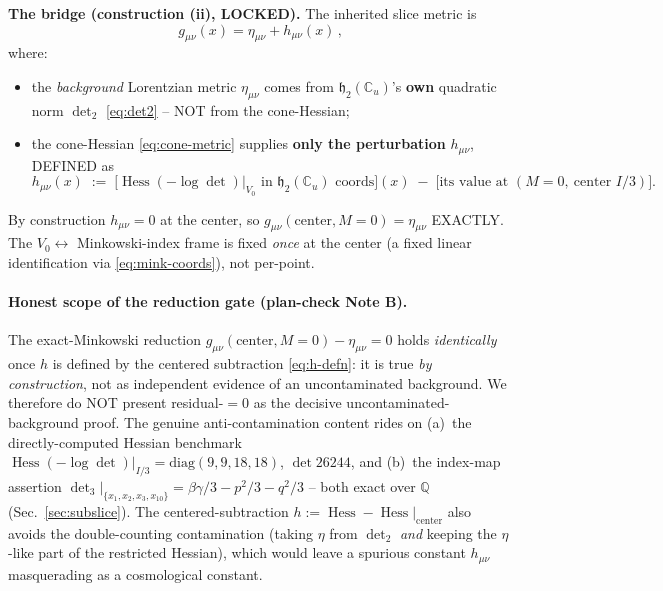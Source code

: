 \medskip
\noindent\textbf{The bridge (construction (ii), LOCKED).} The inherited slice
metric is
\begin{equation}
  \boxed{\,g_{\mu\nu}(x) = \eta_{\mu\nu} + h_{\mu\nu}(x)\,},
  \label{eq:bridge}
\end{equation}
where:
\begin{itemize}
  \item the \emph{background} Lorentzian metric $\eta_{\mu\nu}$ comes from
    $\mathfrak{h}_2(\mathbb{C}_u)$'s \textbf{own} quadratic norm $\det_2$
    \eqref{eq:det2} -- NOT from the cone-Hessian;
  \item the cone-Hessian \eqref{eq:cone-metric} supplies \textbf{only the
    perturbation} $h_{\mu\nu}$, DEFINED as
    \begin{equation}
      h_{\mu\nu}(x) \;:=\;
        \big[\operatorname{Hess}(-\log\det)\big|_{V_0}\text{ in }
          \mathfrak{h}_2(\mathbb{C}_u)\text{ coords}\big](x)
        \;-\;
        \big[\text{its value at } (M=0,\ \text{center } I/3)\big].
      \label{eq:h-defn}
    \end{equation}
\end{itemize}
By construction $h_{\mu\nu} = 0$ at the center, so $g_{\mu\nu}(\text{center},
M{=}0) = \eta_{\mu\nu}$ EXACTLY. The $V_0 \leftrightarrow$ Minkowski-index frame
is fixed \emph{once} at the center (a fixed linear identification via
\eqref{eq:mink-coords}), not per-point.

\paragraph{Honest scope of the reduction gate (plan-check Note B).}
The exact-Minkowski reduction $g_{\mu\nu}(\text{center}, M{=}0) - \eta_{\mu\nu} = 0$
holds \emph{identically} once $h$ is defined by the centered subtraction
\eqref{eq:h-defn}: it is true \emph{by construction}, not as independent evidence
of an uncontaminated background. We therefore do NOT present residual-$=0$ as the
decisive uncontaminated-background proof. The genuine anti-contamination content
rides on (a)~the directly-computed Hessian benchmark
$\operatorname{Hess}(-\log\det)|_{I/3} = \mathrm{diag}(9,9,18,18)$, $\det 26244$,
and (b)~the index-map assertion $\det_3|_{\{x_1,x_2,x_3,x_{10}\}} =
\beta\gamma/3 - p^2/3 - q^2/3$ -- both exact over $\mathbb{Q}$
(Sec.~\ref{sec:subslice}). The centered-subtraction $h := \operatorname{Hess} -
\operatorname{Hess}|_{\text{center}}$ also avoids the double-counting
contamination (taking $\eta$ from $\det_2$ \emph{and} keeping the $\eta$-like part
of the restricted Hessian), which would leave a spurious constant $h_{\mu\nu}$
masquerading as a cosmological constant.

